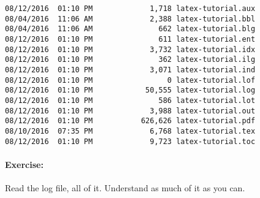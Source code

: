         \begin{verbatim}
08/12/2016  01:10 PM             1,718 latex-tutorial.aux
08/04/2016  11:06 AM             2,388 latex-tutorial.bbl
08/04/2016  11:06 AM               662 latex-tutorial.blg
08/12/2016  01:10 PM               611 latex-tutorial.ent
08/12/2016  01:10 PM             3,732 latex-tutorial.idx
08/12/2016  01:10 PM               362 latex-tutorial.ilg
08/12/2016  01:10 PM             3,071 latex-tutorial.ind
08/12/2016  01:10 PM                 0 latex-tutorial.lof
08/12/2016  01:10 PM            50,555 latex-tutorial.log
08/12/2016  01:10 PM               586 latex-tutorial.lot
08/12/2016  01:10 PM             3,988 latex-tutorial.out
08/12/2016  01:10 PM           626,626 latex-tutorial.pdf
08/10/2016  07:35 PM             6,768 latex-tutorial.tex
08/12/2016  01:10 PM             9,723 latex-tutorial.toc
        \end{verbatim}

        \paragraph{Exercise:} Read the log file, all of it. Understand as much of it as you can.
